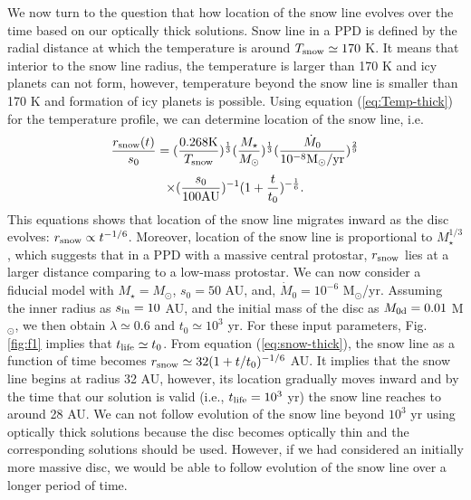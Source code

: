 \documentclass[apj]{emulateapj}
\begin{document}
We now turn to the question that how location of the snow line evolves over the time based on our optically thick solutions. Snow line in a PPD is defined by the radial distance at which the temperature is around $T_{\rm snow}\simeq 170$ K. It means that interior to the snow line radius, the temperature is larger than 170 K and icy planets can not form, however, temperature  beyond the snow line is smaller than 170 K and formation of icy planets is possible. Using equation (\ref{eq:Temp-thick}) for the temperature profile, we can determine location of the snow line, i.e.  
%
\begin{displaymath}
\frac{r_{\rm snow}(t)}{s_0}= (\frac{0.268 {\rm K}}{T_{\rm snow}})^{\frac{1}{3}} (\frac{M_{\star}}{M_{\odot}})^{\frac{1}{3}} (\frac{\dot{M}_0}{10^{-8} {\rm M}_{\odot}/{\rm yr}})^{\frac{2}{9}} 
\end{displaymath}
%
\begin{equation}\label{eq:snow-thick}
\times (\frac{s_0}{100 {\rm AU}})^{-1} (1+\frac{t}{t_0})^{-\frac{1}{6}}.
\end{equation}
%
This equations shows that location of the snow line migrates inward as the disc evolves: $r_{\rm snow} \propto t^{-1/6}$. Moreover, location of the snow line is proportional to $M_{\star}^{1/3}$, which suggests that in a PPD with a massive central protostar, $r_{\rm snow}$ lies at a larger distance  comparing to a low-mass protostar. We can now consider a fiducial model with $M_{\star}=M_{\odot}$, $s_0 = 50$ AU, and, $\dot{M}_0 = 10^{-6}$ M$_{\odot}$/yr. Assuming the inner radius as $s_{\rm in}=10$ AU, and the initial mass of the disc as $M_{\rm 0d}=0.01$ M$_{\odot}$, we then obtain $\lambda \simeq 0.6$ and $t_{0}\simeq 10^3$ yr. For these input parameters, Fig. \ref{fig:f1} implies that $t_{\rm life}\simeq t_0$. From equation (\ref{eq:snow-thick}), the snow line as a function of time becomes $r_{\rm snow} \simeq 32 (1+t/t_0 )^{-1/6}$ AU. It implies that the snow line begins at radius 32 AU, however, its location gradually moves inward  and by the time that our solution is valid (i.e., $t_{\rm life} =10^3$ yr) the snow line reaches to around 28 AU.  We can not follow evolution of the snow line beyond $10^3$ yr using optically thick solutions because the disc becomes optically thin and the corresponding solutions should be used. However, if we had considered an initially more massive disc, we would be able to follow evolution of the snow line over a longer period of time.  


%
\end{document}

